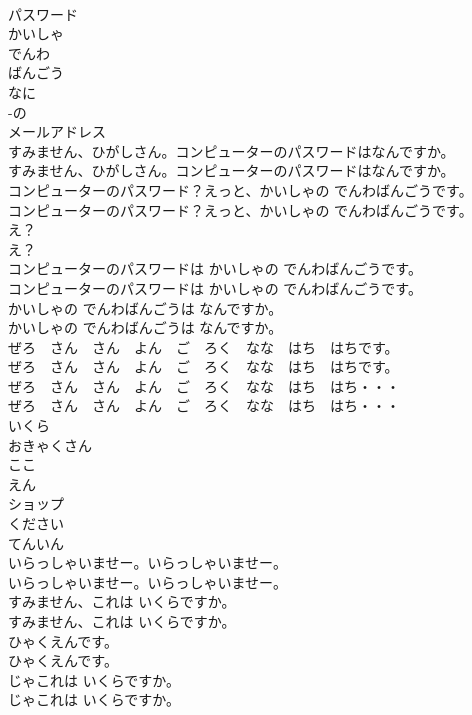\documentclass[8pt]{extreport}
\begin{document}
\begin{CJK}{UTF8}{min}
\\	パスワード
\\	かいしゃ
\\	でんわ
\\	ばんごう
\\	なに
\\	-の
\\	メールアドレス
\\	すみません、ひがしさん。コンピューターのパスワードはなんですか。	
\\	すみません、ひがしさん。コンピューターのパスワードはなんですか。 
\\	コンピューターのパスワード？えっと、かいしゃの でんわばんごうです。	
\\	コンピューターのパスワード？えっと、かいしゃの でんわばんごうです。 
\\	え？	
\\	え？ 
\\	コンピューターのパスワードは かいしゃの でんわばんごうです。	
\\	コンピューターのパスワードは かいしゃの でんわばんごうです。 
\\	かいしゃの でんわばんごうは なんですか。	
\\	かいしゃの でんわばんごうは なんですか。 
\\	ぜろ　さん　さん　よん　ご　ろく　なな　はち　はちです。	
\\	ぜろ　さん　さん　よん　ご　ろく　なな　はち　はちです。 
\\	ぜろ　さん　さん　よん　ご　ろく　なな　はち　はち・・・	
\\	ぜろ　さん　さん　よん　ご　ろく　なな　はち　はち・・・ 
\\	いくら
\\	おきゃくさん
\\	ここ
\\	えん
\\	ショップ
\\	ください
\\	てんいん
\\	いらっしゃいませー。いらっしゃいませー。	
\\	いらっしゃいませー。いらっしゃいませー。 
\\	すみません、これは いくらですか。	
\\	すみません、これは いくらですか。 
\\	ひゃくえんです。	
\\	ひゃくえんです。 
\\	じゃこれは いくらですか。	
\\	じゃこれは いくらですか。 

\end{CJK}
\end{document}
